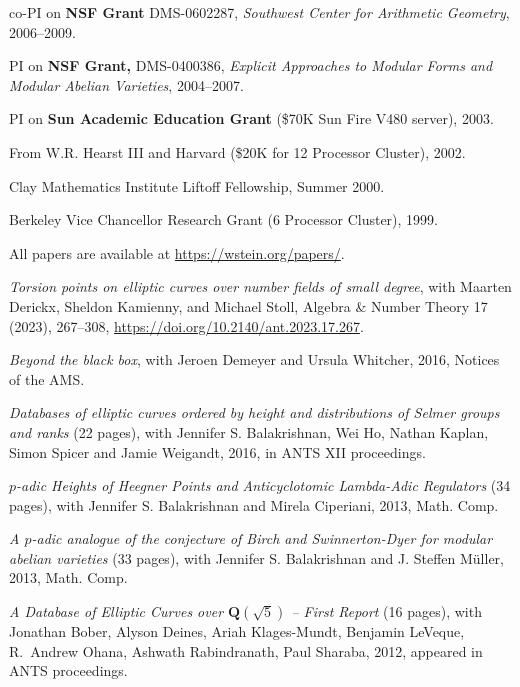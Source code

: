 \documentclass[10pt]{article}
\newcommand{\ptitle}{\em}
\newcounter{totalnumpapers}
\newcounter{totalnumgrants}
\newenvironment{papers}
   {
   \begin{revnumerate}[\value{totalnumpapers}]
   {}
         {
            \setlength{\itemsep}{.5ex}
            \setlength{\parsep}{0ex}
            \setlength{\leftmargin}{0em}
            \setlength{\parskip}{0ex}
            \setlength{\topsep}{0ex}
         }
   }
   {
\end{revnumerate}
   }
\newenvironment{grants}
   {
   \begin{revnumerate}[\value{totalnumgrants}]
   {}
         {
            \setlength{\itemsep}{.5ex}
            \setlength{\parsep}{0ex}
            \setlength{\leftmargin}{0em}
            \setlength{\parskip}{0ex}
            \setlength{\topsep}{0ex}
         }
   }
   {
\end{revnumerate}
   }
\newcommand{\marginlabel}[1]{
\begin{minipage}[b]{0.8\labelwidth}{\large \textsf{\textbf{#1}}}\end{minipage}}
\newcommand{\entrylabel}[1]{\mbox{\marginlabel{#1}}\hfill}
\newcommand{\MainListlabel}[1]
   {
      \parbox[t]{\labelwidth}{\hspace{.8em}\marginlabel{#1}}
   }
\newenvironment{MainList}[1]
   {
      \renewcommand{\entrylabel}{\MainListlabel}
      \begin{list}{}
      {
         \renewcommand{\makelabel}{\entrylabel}
         \setlength   {\itemindent}{-.65em}
         \setlength   {\labelwidth}{#1}
         \setlength   {\leftmargin}{\labelwidth}
         \setlength   {\itemsep}{3ex}
      }
   }
   {
      \end{list}
   }
\begin{document}
\begin{MainList}{88pt}
\begin{grants}
\item co-PI on {\bf NSF Grant} DMS-0602287, {\em Southwest Center for Arithmetic Geometry}, 2006--2009.
\item PI on {\bf NSF Grant,} DMS-0400386, {\em Explicit Approaches to Modular Forms and Modular Abelian Varieties}, 2004--2007.
\item PI on {\bf Sun Academic Education Grant} (\$70K Sun Fire V480 server), 2003.
\item From W.\thinspace{}R. Hearst III and Harvard
(\$20K for 12 Processor Cluster), 2002.
\item Clay Mathematics Institute Liftoff Fellowship, Summer 2000.
\item Berkeley Vice Chancellor Research Grant (6 Processor Cluster), 1999.
\end{grants}


\item[Publications] All papers are available at \url{https://wstein.org/papers/}.
 \begin{papers}

 \item {\em Torsion points on elliptic curves over number fields of small
 degree}, with Maarten Derickx, Sheldon Kamienny, and Michael Stoll,
 Algebra \& Number Theory 17 (2023), 267--308,
 \url{https://doi.org/10.2140/ant.2023.17.267}.

 \item {\em Beyond the black box}, with Jeroen Demeyer and Ursula Whitcher, 2016, Notices of the AMS.
 \item {\em Databases of elliptic curves ordered by height and distributions of Selmer groups and ranks} (22 pages), with Jennifer S. Balakrishnan, Wei Ho, Nathan Kaplan, Simon Spicer and Jamie Weigandt, 2016, in ANTS XII proceedings.

 \item {\em $p$-adic Heights of Heegner Points and Anticyclotomic Lambda-Adic Regulators} (34 pages), with Jennifer S. Balakrishnan and Mirela Ciperiani, 2013,
 Math. Comp.

\item {\ptitle A $p$-adic analogue of the conjecture of Birch and Swinnerton-Dyer for modular abelian varieties} (33 pages), with Jennifer S. Balakrishnan and J. Steffen M\"uller, 2013, Math. Comp.

\item {\ptitle A Database of Elliptic Curves over $\mathbf{Q}(\sqrt{5})$ -- First Report}
 (16 pages), with Jonathan Bober, Alyson Deines, Ariah Klages-Mundt, Benjamin LeVeque, R.~Andrew Ohana, Ashwath Rabindranath, Paul Sharaba, 2012, appeared in ANTS proceedings.


\end{papers}
\end{MainList}
\end{document}

